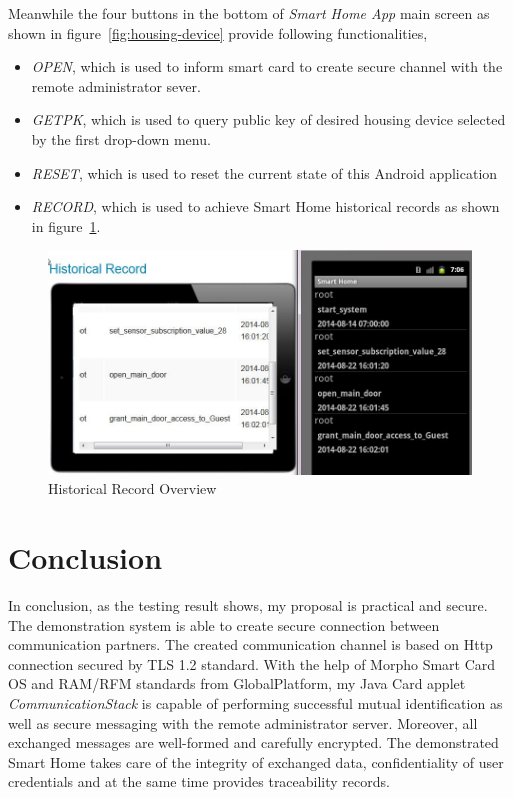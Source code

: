 Meanwhile the four buttons in the bottom of  \emph{Smart Home App} main screen as shown in figure~\ref{fig:housing-device} provide following functionalities,
\begin{itemize}
\item \emph{OPEN}, which is used to inform smart card to create secure channel with the remote administrator sever.
\item \emph{GETPK}, which is used to query public key of desired housing device selected  by the first drop-down menu.
\item \emph{RESET}, which is used to reset the current state of this Android application
\item \emph{RECORD}, which is used to achieve Smart Home historical records as shown in figure~\ref{fig:record-query}.

\end{itemize}

\begin{figure}[!htb]
	\centering
	\includegraphics[width=1\textwidth]{Images/impl/record-query.jpg}
		\caption{Historical Record Overview}
	\label{fig:record-query}
\end{figure}

\section{Conclusion}
In conclusion, as the testing result shows, my proposal is practical and secure. The demonstration system is able to create secure connection between communication partners. The created communication channel is based on Http connection secured by TLS 1.2 standard. With the help of Morpho Smart Card OS and RAM/RFM standards from GlobalPlatform, my Java Card applet \emph{CommunicationStack} is capable of performing successful mutual identification as well as secure messaging with the remote administrator server. Moreover, all exchanged messages are well-formed and carefully encrypted. The demonstrated Smart Home takes care of the integrity of exchanged data, confidentiality of user credentials and at the same time provides traceability records.